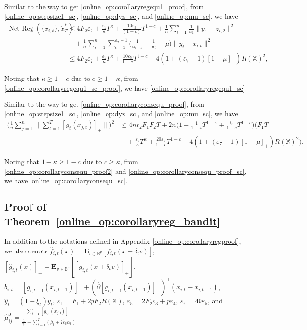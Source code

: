 \documentclass[12pt,draftcls,onecolumn]{IEEEtran}%
\DeclareMathOperator{\NetReg}{Net-Reg}
\begin{document}
Similar to the way to get \eqref{online_op:corollaryregequ1_proof}, from \eqref{online_op:stepsize1_sc},  \eqref{online_op:dyz_sc}, and \eqref{online_op:mu_sc},  we have
\begin{align}\label{online_op:corollaryregequ1_sc_proof}
\NetReg(\{x_{i,t}\},\check{x}^*_{T})
&\le 4F_2\varepsilon_2
+\frac{\varepsilon_1}{\kappa}T^\kappa+\frac{10\varepsilon_5}{(1-c)}T^{1-c}
+\frac{1}{n}\sum_{i=1}^{n}\frac{1}{\alpha_{1}}\|y_1-z_{i,2}\|^2\nonumber\\
&\quad
+\frac{1}{n}\sum_{i=1}^{n}\sum_{t=1}^{\varepsilon_7-1}\Big(\frac{1}{\alpha_{t+1}}-\frac{1}{\alpha_{t}}-\mu\Big)
\|y_t-x_{i,t}\|^2\nonumber\\
&\le 4F_2\varepsilon_2
+\frac{\varepsilon_1}{\kappa}T^\kappa+\frac{10\varepsilon_5}{1-c}T^{1-c}
+4(1+(\varepsilon_7-1)[1-\mu]_+)R(\mathbb{X})^2,
\end{align}

Noting that $\kappa\ge1-c$ due to $c\ge1-\kappa$, from \eqref{online_op:corollaryregequ1_sc_proof}, we have \eqref{online_op:corollaryregequ1_sc}.

 Similar to the way to get \eqref{online_op:corollaryconsequ_proof}, from \eqref{online_op:stepsize1_sc}, \eqref{online_op:dyz_sc}, and \eqref{online_op:mu_sc},  we have
\begin{align}\label{online_op:corollaryconsequ_proof_sc}
\Big(\frac{1}{n}\sum_{j=1}^n\Big\|\sum_{t=1}^T[g_{t}(x_{j,t})]_+\Big\|\Big)^2
&\le 4n\varepsilon_2F_1F_2T
+2n\Big(1+\frac{1}{1-\kappa}T^{1-\kappa}+\frac{\varepsilon_6}{1-c}T^{1-c}\Big)
\Big(F_1T\nonumber\\
&\quad+\frac{\varepsilon_1}{\kappa}T^\kappa +\frac{20\varepsilon_5}{1-c}T^{1-c}
+4(1+(\varepsilon_7-1)[1-\mu]_+)R(\mathbb{X})^2\Big).
\end{align}

Noting that $1-\kappa\ge1-c$ due to $c\ge\kappa$, from  \eqref{online_op:corollaryconsequ_proof2} and \eqref{online_op:corollaryconsequ_proof_sc}, we have \eqref{online_op:corollaryconsequ_sc}.





\subsection{Proof of Theorem~\ref{online_op:corollaryreg_bandit}}\label{online_op:corollaryregproof_bandit}
In addition to the notations defined in Appendix~\ref{online_op:corollaryregproof},
we also denote $\hat{f}_{i,t}(x)=\mathbf{E}_{v\in\mathbb{B}^p}[f_{i,t}(x+\delta_{t} v)]$, $[\hat{g}_{i,t}(x)]_+=\mathbf{E}_{v\in\mathbb{B}^p}[[g_{i,t}(x+\delta_{t} v)]_+]$, $\hat{b}_{i,t}=[g_{i,t-1}(x_{i,t-1})]_+ +(\hat{\partial} [g_{i,t-1}(x_{i,t-1})]_+)^\top(x_{i,t}-x_{i,t-1})$,  $\hat{y}_{t}=(1-\xi_t)y_{t}$, $\hat{\varepsilon}_{1}=F_1+2pF_2R(\mathbb{X})$,
$\hat{\varepsilon}_5=2F_2\varepsilon_3+p\varepsilon_4$,
$\hat{\varepsilon}_6=40\hat{\varepsilon}_5$, and $\hat{\mu}_{ij}^0=\frac{\sum_{t=1}^T[g_{i,t}(x_{j,t})]_+}
{\frac{1}{\gamma_1}+\sum_{t=1}^T(\beta_{t}+2\hat{\varepsilon}_6\alpha_{t})}$.
\end{document}
